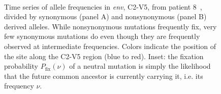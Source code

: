 \documentclass[rmp, twocolumn]{revtex4}
\newcommand{\env}{\textit{env}}
\begin{document}
\begin{figure}
\begin{center}
\\
\caption{Time series of allele frequencies in \env, C2-V5, from
patient 8~\cite{shankarappa_consistent_1999},
divided by synonymous (panel A) and nonsynonymous (panel B) derived alleles.
While nonsynonymous mutations frequently fix, very few synonymous
mutations do even though they are frequently observed at intermediate
frequencies. Colors indicate the position of the site along the C2-V5 region
(blue to red). Inset: the fixation probability $P_\text{fix}(\nu)$ of a neutral mutation
is simply the likelihood that the future common ancestor is currently carrying
it, i.e. its frequency $\nu$.}
\label{fig:aft}
\end{center}
\end{figure}
\end{document}
